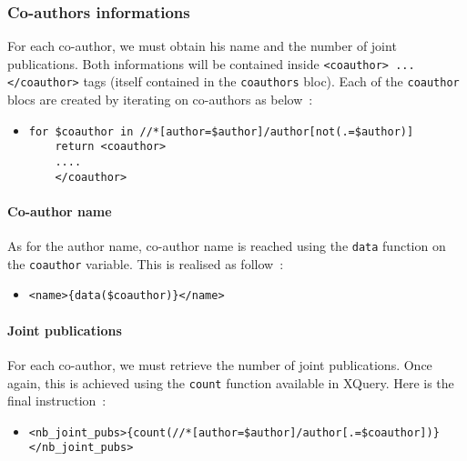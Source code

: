 \documentclass{article}
\begin{document}
    \subsubsection{Co-authors informations}
      For each co-author, we must obtain his name and the number of joint publications. Both informations will be contained inside \verb|<coauthor> ... </coauthor>| tags (itself contained in the \verb|coauthors| bloc). Each of the \verb|coauthor| blocs are created by iterating on co-authors as below~:
      \begin{itemize}
	\item \begin{verbatim}
for $coauthor in //*[author=$author]/author[not(.=$author)]
    return <coauthor>
    ....
    </coauthor>\end{verbatim}
      \end{itemize}
      
      \paragraph{Co-author name}
	As for the author name, co-author name is reached using the \verb|data| function on the \verb|coauthor| variable. This is realised as follow~:
	\begin{itemize}
	  \item \verb|<name>{data($coauthor)}</name>|
	\end{itemize}
	
      \paragraph{Joint publications}
	For each co-author, we must retrieve the number of joint publications. Once again, this is achieved using the \verb|count| function available in XQuery. Here is the final instruction~:
	\begin{itemize}
	  \item \verb|<nb_joint_pubs>{count(//*[author=$author]/author[.=$coauthor])}</nb_joint_pubs>|
	\end{itemize}
\end{document}
